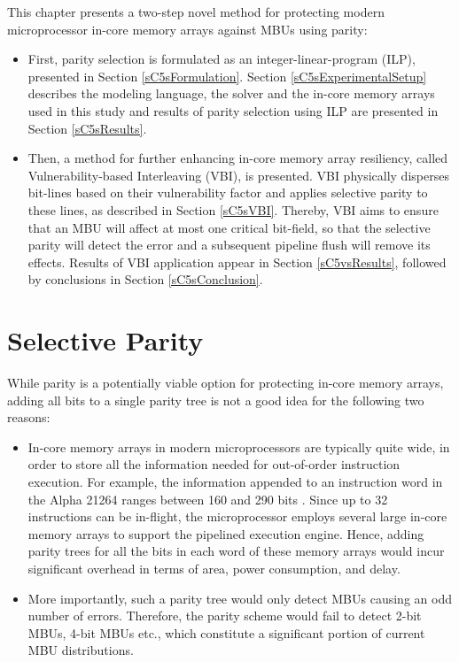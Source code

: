 \documentclass[12pt]{yalephd}
\begin{document}
This chapter presents a two-step novel method for protecting modern microprocessor in-core memory arrays against MBUs using parity:

\begin{itemize}
\item First, parity selection is formulated as an integer-linear-program (ILP), presented in Section \ref{sC5sFormulation}. Section \ref{sC5sExperimentalSetup} describes the modeling language, the solver and the in-core memory arrays used in this study and results of parity selection using ILP are presented in Section \ref{sC5sResults}.
\item Then, a method for further enhancing in-core memory array resiliency, called Vulnerability-based Interleaving (VBI), is presented. VBI physically disperses bit-lines based on their vulnerability factor and applies selective parity to these lines, as described in Section \ref{sC5sVBI}. Thereby, VBI aims to ensure that an MBU will affect at most one critical bit-field, so that the selective parity will detect the error and a subsequent pipeline flush will remove its effects. Results of VBI application appear in Section \ref{sC5vsResults}, followed by conclusions in Section \ref{sC5sConclusion}.
\end{itemize}

\section{Selective Parity}\label{sC5sParitySelection}

While parity is a potentially viable option for protecting in-core memory arrays, adding all bits to a single parity tree is not a good idea for the following two reasons:
\begin{itemize}
\item In-core memory arrays in modern microprocessors are typically quite wide, in order to store all the information needed for out-of-order instruction execution. For example, the information appended to an instruction word in the Alpha 21264 ranges between 160 and 290 bits \cite{kessler1999alpha}. Since up to 32 instructions can be in-flight, the microprocessor employs several large in-core memory arrays to support the pipelined execution engine. Hence, adding parity trees for all the bits in each word of these memory arrays would incur significant overhead in terms of area, power consumption, and delay.
\item More importantly, such a parity tree would only detect MBUs causing an odd number of errors. Therefore, the parity scheme would fail to detect 2-bit MBUs, 4-bit MBUs etc., which constitute a significant portion of current MBU distributions.
\end{itemize}
\end{document}
